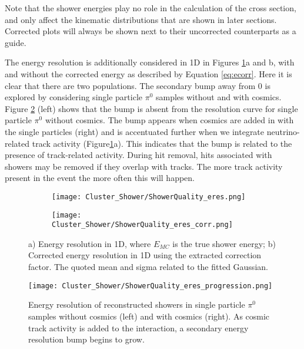 \noindent Note that the shower energies play no role in the calculation of the cross section, and only affect the kinematic distributions that are shown in later sections. Corrected plots will always be shown next to their uncorrected counterparts as a guide. 
\par The energy resolution is additionally considered in 1D in Figures \ref{fig:showerquality_eres_corr}a and b, with and without the corrected energy as described by Equation \ref{eq:ecorr}. Here it is clear that there are two populations.  The secondary bump away from 0 is explored by considering single particle $\pi^0$ samples without and with cosmics.  Figure \ref{fig:showerquality_eres_series} (left) shows that the bump is absent from the resolution curve for single particle $\pi^0$ without cosmics.  The bump appears when cosmics are added in with the single particles (right) and is accentuated further when we integrate neutrino-related track activity (Figure\ref{fig:showerquality_eres_corr}a). This indicates that the bump is related to the presence of track-related activity.  During hit removal, hits associated with showers may be removed if they overlap with tracks.  The more track activity present in the event the more often this will happen. %

\begin{figure}[H]
  \begin{subfigure}[t]{0.35\textwidth}
\texttt{[image: Cluster\_Shower/ShowerQuality\_eres.png]}
  \caption{ }
  \end{subfigure} 
  \hspace{15mm}
  \begin{subfigure}[t]{0.35\textwidth}
\texttt{[image: Cluster\_Shower/ShowerQuality\_eres\_corr.png]}
  \caption{ }
  \end{subfigure} 
\caption{a) Energy resolution in 1D, where $E_{MC}$ is the true shower energy; b) Corrected energy resolution in 1D using the extracted correction factor. The quoted mean and sigma related to the fitted Gaussian.}
\label{fig:showerquality_eres_corr}
\end{figure}

\begin{figure}[H]
\centering
 \texttt{[image: Cluster\_Shower/ShowerQuality\_eres\_progression.png]}
 \caption{Energy resolution of reconstructed showers in single particle $\pi^0$ samples without cosmics (left) and with cosmics (right).  As cosmic track activity is added to the interaction, a secondary energy resolution bump begins to grow.  }
\label{fig:showerquality_eres_series}
\end{figure}


